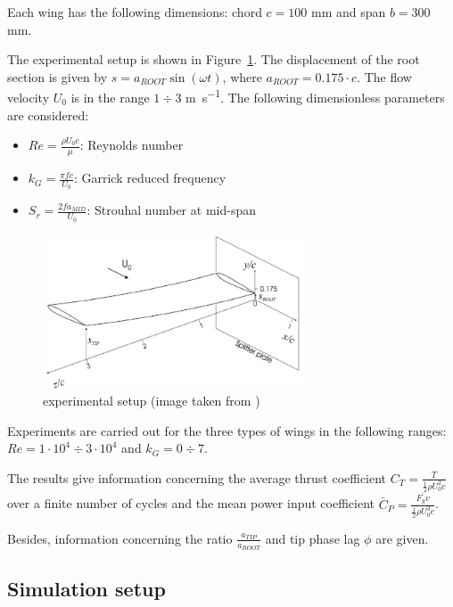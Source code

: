Each wing has the following dimensions: chord $c=100$ \si{mm} and span $b=300$ \si{mm}.

The experimental setup is shown in Figure~\ref{fig:0012exp}. The displacement of the root section is given by $s = a_{ROOT} \sin(\omega t)$, where $a_{ROOT} = 0.175\cdot c$. The flow velocity $U_0$ is in the range $1\div3$ \si{m.s^{-1}}. The following dimensionless parameters are considered:

\begin{itemize}
	\item $Re = \frac{\rho U_0 c}{\mu}$: Reynolds number
	\item $k_G = \frac{\pi f c}{U_0}$: Garrick reduced frequency
	\item $S_r = \frac{2f a_{MID}}{U_0}$: Strouhal number at mid-span
\end{itemize}

\begin{figure}[htbp!]
	\centering
	\includegraphics[width=0.7\textwidth]{images/naca0012_exp}
	\caption{experimental setup (image taken from \cite{heathcote2008effect})}
	\label{fig:0012exp}
\end{figure}

Experiments are carried out for the three types of wings in the following ranges: $Re=1\cdot10^4\div 3\cdot10^4$ and $k_G=0 \div 7$.

The results give information concerning the average thrust coefficient $C_T = \frac{T}{\frac{1}{2}\rho U_0^2c}$ over a finite number of cycles and the mean power input coefficient $\bar{C}_P = \frac{\bar{F_y v}}{\frac{1}{2}\rho U_0^3c}$.

Besides, information concerning the ratio $\frac{a_{TIP}}{a_{ROOT}}$ and tip phase lag $\phi$ are given.

\subsection{Simulation setup}

